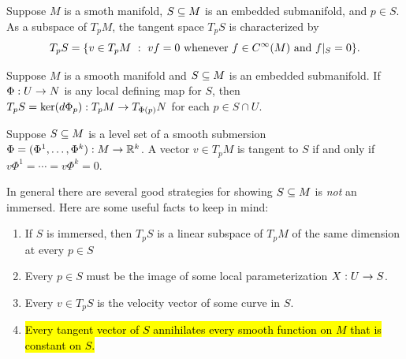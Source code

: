 \setcounter{thm}{36}

\begin{prop}
Suppose $M$ is a smoth manifold, $S\subseteq M$ is an embedded submanifold, and $p\in S$. As a subspace of $T_pM$, the tangent space $T_pS$ is characterized by
\[T_pS = \{v\in T_pM\ :\ vf = 0\text{ whenever $f\in \Cin(M)$ and }f|_S = 0\}.\]
\end{prop}

\begin{prop}
Suppose $M$ is a smooth manifold and $S\subseteq M$ is an embedded submanifold. If $\Phi:U\rightarrow N$ is any local defining map for $S$, then $T_pS = \ker(d\Phi_p):T_pM\rightarrow T_{\Phi(p)}N$ for each $p\in S\cap U$.
\end{prop}

\begin{cor}
Suppose $S\subseteq M$ is a level set of a smooth submersion $\Phi = (\Phi^1,\ldots,\Phi^k):M\rightarrow \mathbb{R}^k$. A vector $v\in T_pM$ is tangent to $S$ if and only if $v\Phi^1= \cdots = v\Phi^k = 0$.
\end{cor}


 In general there are several good strategies for showing $S\subseteq M$ is \textit{not} an immersed. Here are some useful facts to keep in mind:
\begin{enumerate}
    \item If $S$ is immersed, then $T_pS$ is a linear subspace of $T_pM$ of the same dimension at every $p\in S$
    \item Every $p\in S$ must be the image of some local parameterization $X:U\rightarrow S$.
    \item Every $v\in T_pS$ is the velocity vector of some curve in $S$.
    \item \hl{Every tangent vector of $S$ annihilates every smooth function on $M$ that is constant on $S$.}
\end{enumerate}
